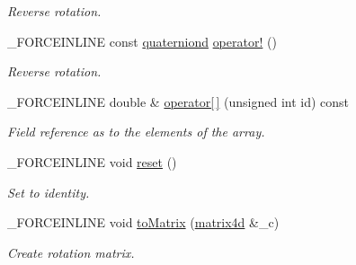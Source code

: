 \begin{DoxyCompactItemize}
\begin{DoxyCompactList}\small\item\em Reverse rotation. \end{DoxyCompactList}\item 
\hypertarget{classbt_1_1quaterniond_aa8b8a5ef591bc8e9da2035207de403c4}{\-\_\-\-F\-O\-R\-C\-E\-I\-N\-L\-I\-N\-E const \hyperlink{classbt_1_1quaterniond}{quaterniond} \hyperlink{classbt_1_1quaterniond_aa8b8a5ef591bc8e9da2035207de403c4}{operator!} ()}\label{classbt_1_1quaterniond_aa8b8a5ef591bc8e9da2035207de403c4}

\begin{DoxyCompactList}\small\item\em Reverse rotation. \end{DoxyCompactList}\item 
\hypertarget{classbt_1_1quaterniond_a14b2392c450d64bad1f11bc0c2ca43a5}{\-\_\-\-F\-O\-R\-C\-E\-I\-N\-L\-I\-N\-E double \& \hyperlink{classbt_1_1quaterniond_a14b2392c450d64bad1f11bc0c2ca43a5}{operator\mbox{[}$\,$\mbox{]}} (unsigned int id) const }\label{classbt_1_1quaterniond_a14b2392c450d64bad1f11bc0c2ca43a5}

\begin{DoxyCompactList}\small\item\em Field reference as to the elements of the array. \end{DoxyCompactList}\item 
\hypertarget{classbt_1_1quaterniond_acfdb0d1c1683fc81b432831115a479a9}{\-\_\-\-F\-O\-R\-C\-E\-I\-N\-L\-I\-N\-E void \hyperlink{classbt_1_1quaterniond_acfdb0d1c1683fc81b432831115a479a9}{reset} ()}\label{classbt_1_1quaterniond_acfdb0d1c1683fc81b432831115a479a9}

\begin{DoxyCompactList}\small\item\em Set to identity. \end{DoxyCompactList}\item 
\hypertarget{classbt_1_1quaterniond_ae90b0da1451f58a4fa8b3d48b15cd76e}{\-\_\-\-F\-O\-R\-C\-E\-I\-N\-L\-I\-N\-E void \hyperlink{classbt_1_1quaterniond_ae90b0da1451f58a4fa8b3d48b15cd76e}{to\-Matrix} (\hyperlink{classbt_1_1matrix4d}{matrix4d} \&\-\_\-c)}\label{classbt_1_1quaterniond_ae90b0da1451f58a4fa8b3d48b15cd76e}

\begin{DoxyCompactList}\small\item\em Create rotation matrix. \end{DoxyCompactList}\end{DoxyCompactItemize}
